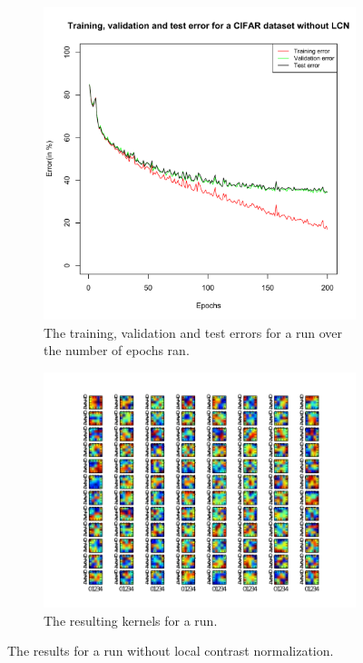 \begin{figure}[ht!]
	\centering
\begin{subfigure}[b]{0.45\textwidth}
	\includegraphics[width=\textwidth]{./img/Exercise3/Run1/errorplots.pdf}	
	\caption{The training, validation and test errors for a run over the number of epochs ran.}
	\label{fig:5:errorsNoLCN}
\end{subfigure}
\begin{subfigure}[b]{0.45\textwidth}
	\includegraphics[width=\textwidth]{./img/Exercise3/Run1/3264end.png}	
	\caption{The resulting kernels for a run.}
	\label{fig:3:kernelsNoLCN}
\end{subfigure}
\caption{The results for a run without local contrast normalization.}
\end{figure}

